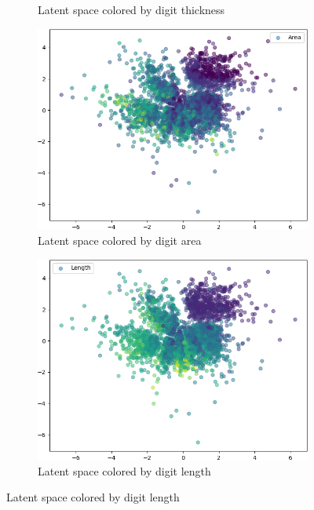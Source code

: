 \begin{figure}
\begin{subfigure}{.32\textwidth}
        \caption{Latent space colored by digit thickness}
        \label{subfig:vae_mnist_latent_space_thickness}
    \end{subfigure}
    \hfill
    \begin{subfigure}{.32\textwidth}
        \includegraphics[width=\textwidth]{images/latent_spaces/mnist/vae/embeddings_mu_2.png}
        \caption{Latent space colored by digit area}
        \label{subfig:vae_mnist_latent_space_area}
    \end{subfigure}
    \hfill
    \begin{subfigure}{.24\textwidth}
        \includegraphics[width=\textwidth]{images/latent_spaces/mnist/vae/embeddings_mu_3.png}
        \caption{Latent space colored by digit length}

\end{subfigure}
\end{figure}
